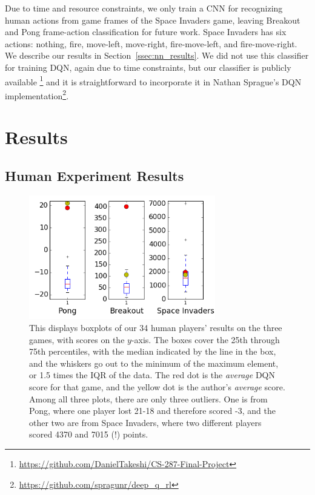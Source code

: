 \documentclass[letterpaper, 10 pt, conference]{ieeeconf}  %
\begin{document}
Due to time and resource constraints, we only train a CNN for recognizing human actions from game
frames of the Space Invaders game, leaving Breakout and Pong frame-action classification for future
work. Space Invaders has six actions: nothing, fire, move-left, move-right, fire-move-left, and
fire-move-right. We describe our results in Section~\ref{ssec:nn_results}. We did not use this
classifier for training DQN, again due to time constraints, but our classifier is publicly available
\footnote{\url{https://github.com/DanielTakeshi/CS-287-Final-Project}} and it is straightforward to
incorporate it in Nathan Sprague's DQN
implementation\footnote{\url{https://github.com/spragunr/deep_q_rl}}.


\section{Results}\label{sec:results}

\subsection{Human Experiment Results}\label{ssec:human_results}


\begin{figure}[t]
\centering
\includegraphics[width=3.2in]{fig_boxplots_human_results.png}
\caption{This displays boxplots of our 34 human players' results on the three games, with scores on
the $y$-axis. The boxes cover the 25th through 75th percentiles, with the median indicated by the
line in the box, and the whiskers go out to the minimum of the maximum element, or 1.5 times the
IQR of the data. The red dot is the \emph{average} DQN score for that game, and the yellow dot is
the author's \emph{average} score. Among all three plots, there are only three outliers. One is from
Pong, where one player lost 21-18 and therefore scored -3, and the other two are from Space
Invaders, where two different players scored 4370 and 7015 (!) points.}
\label{fig:human_results}
\end{figure}
\end{document}
